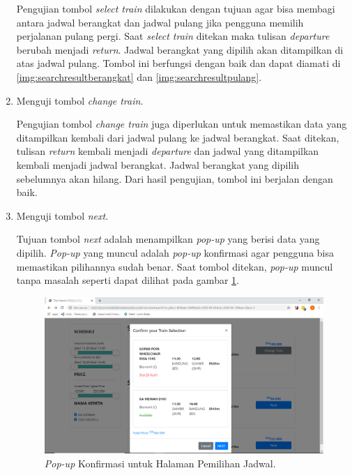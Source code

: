 \begin{enumerate}
        Pengujian tombol \textit{select train} dilakukan dengan tujuan agar bisa membagi antara jadwal berangkat dan jadwal pulang jika pengguna memilih perjalanan pulang pergi. Saat \textit{select train} ditekan maka tulisan \textit{departure} berubah menjadi \textit{return}. Jadwal berangkat yang dipilih akan ditampilkan di atas jadwal pulang. Tombol ini berfungsi dengan baik dan dapat diamati di \ref{img:searchresultberangkat} dan \ref{img:searchresultpulang}.
        
        \item Menguji tombol \textit{change train}.
        
        Pengujian tombol \textit{change train} juga diperlukan untuk memastikan data yang ditampilkan kembali dari jadwal pulang ke jadwal berangkat. Saat ditekan, tulisan \textit{return} kembali menjadi \textit{departure} dan jadwal yang ditampilkan kembali menjadi jadwal berangkat. Jadwal berangkat yang dipilih sebelumnya akan hilang. Dari hasil pengujian, tombol ini berjalan dengan baik.
        
        \item Menguji tombol \textit{next}.
        
        Tujuan tombol \textit{next} adalah menampilkan \textit{pop-up} yang berisi data yang dipilih. \textit{Pop-up} yang muncul adalah \textit{pop-up} konfirmasi agar pengguna bisa memastikan pilihannya sudah benar. Saat tombol ditekan, \textit{pop-up} muncul tanpa masalah seperti dapat dilihat pada gambar \ref{img:popuppilihjadwal}.
        
        \begin{figure}[H]
        \center
        \includegraphics[width=\textwidth,height=\textheight,keepaspectratio]{Gambar/Konfirmasi pilih jadwal.png}
        \caption{\textit{Pop-up} Konfirmasi untuk Halaman Pemilihan Jadwal.}
            \label{img:popuppilihjadwal}
        \end{figure}
        

\end{enumerate}

